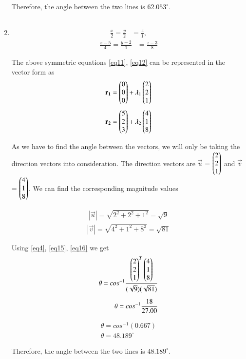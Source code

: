 \documentclass[journal,12pt,twocolumn]{IEEEtran}
\begin{document}
\begin{enumerate}
Therefore, the angle between the two lines is $62.053^\circ$.
\\
\\






	\item 
	\begin{align}\label{eq11}
		\frac{x}{2} = \frac{y}{2} &= \frac{z}{1}, 
	\end{align}
	\begin{align}\label{eq12}
		\frac{x-5}{4} = \frac{y-2}{1} &= \frac{z-3}{8} 
	\end{align}



The above symmetric equations \ref{eq11}, \ref{eq12} can be represented in the vector form as 
\begin{align}\label{eq13}
	\quad \mathbf{r_1} &= \begin{pmatrix}0\\0\\0\end{pmatrix} + \lambda_1\begin{pmatrix}2\\2\\1\end{pmatrix}
\end{align}
\begin{align}\label{eq14}
	\quad \mathbf{r_2} &= \begin{pmatrix}5\\2\\3\end{pmatrix} + \lambda_2\begin{pmatrix}4\\1\\8\end{pmatrix}
\end{align}

As we have to find the angle between the vectors, we will only be taking the direction vectors into consideration. The direction vectors are $\vec{u}$ = $\begin{pmatrix}2\\2\\1\end{pmatrix}$ and $\vec{v}$ = $\begin{pmatrix}4\\1\\8\end{pmatrix}$. We can find the corresponding magnitude values

\begin{align}\label{eq15}
	|\vec{u}| =\sqrt{2^{2}+2^{2}+1^{2}} =\sqrt{9}
\end{align}
\begin{align}\label{eq16}
	|\vec{v}| =\sqrt{4^{2}+1^{2}+8^{2}} =\sqrt{81}
\end{align}

Using \ref{eq4}, \ref{eq15}, \ref{eq16} we get
\begin{align}
	\theta = cos^{-1}\frac{\begin{pmatrix}2\\2\\1\end{pmatrix}^{T}\begin{pmatrix}4\\1\\8\end{pmatrix}}{(\sqrt{9})(\sqrt{81})} 
	\\[0.2cm]
	\theta = cos^{-1}\frac{18}{27.00}
\end{align}

\begin{align}
	\theta = cos^{-1} (0.667)
	\\[0.2cm]
	\theta = 48.189^\circ
\end{align}

Therefore, the angle between the two lines is $48.189^\circ$.
\end{enumerate}

    
\end{document}
